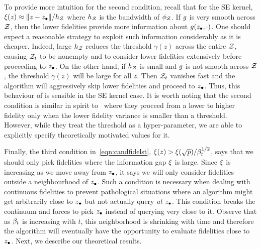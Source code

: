 To provide more intuition for the second condition,
recall that for the SE kernel, $\xi(z) \approx \|z-z_{\bullet}\|/h_{\mathcal{Z}}$ where $h_{\mathcal{Z}}$ is the
bandwidth of $\phi_{\mathcal{Z}}$.
If $g$ is very smooth across $\mathcal{Z}$, then the lower fidelities provide more
information about $g(z_{\bullet},\cdot)$.
One should expect a reasonable strategy
to exploit such information considerably as it is cheaper.
Indeed, large $h_{\mathcal{Z}}$ reduces the threshold $\gamma(z)$ across the
entire $\mathcal{Z}$, causing $\mathcal{Z}_t$ to be nonempty and \mfgpucbtwos to
consider lower fidelities extensively before proceeding to $z_{\bullet}$.
On the other hand, if $h_{\mathcal{Z}}$ is small and $g$ is not smooth across $\mathcal{Z}$, the
threshold $\gamma(z)$ will be large for all $z$. 
Then $\mathcal{Z}_t$ vanishes fast and the algorithm will aggressively
skip lower fidelities and proceed to $z_{\bullet}$.
Thus, this behaviour of \mfgpucbtwos is sensible in the SE kernel case.
It is worth noting that the second condition is similar in
spirit to~\citet{kandasamy16mfbo} where they proceed from a lower to higher
fidelity only when the lower fidelity variance is smaller than a threshold.
However, while they treat the threshold as a hyper-parameter, we are able to explicitly
specify theoretically motivated values for it.


Finally, the third condition in~\eqref{eqn:candfidelst},
$\xi(z) > \xi(\sqrt{p})/\beta^{1/2}_t$, 
says that we should only pick
fidelities where the information gap $\xi$ is large.
Since $\xi$ is increasing as we move away from
$z_{\bullet}$, it says we will only consider fidelities outside a neighbourhood of $z_{\bullet}$.
Such a condition is necessary when dealing with continuous fidelities to
prevent pathological situations where an algorithm might get arbitrarily close to
$z_{\bullet}$ but not actually query \emph{at} $z_{\bullet}$.
This condition breaks the continuum and forces \bocas to pick $z_{\bullet}$ instead of
querying very close to it.
Observe that as $\beta_t$ is increasing with $t$, this neighborhood is shrinking with time
and therefore the algorithm will eventually have the opportunity to evaluate fidelities
close to $z_{\bullet}$.
Next, we describe our theoretical results.







